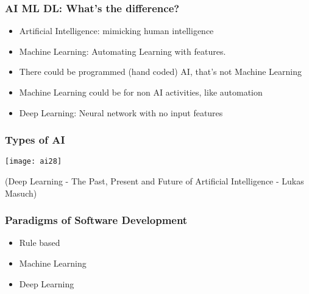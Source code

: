 \begin{frame}[fragile] \frametitle{AI ML DL: What's the difference?}

\begin{itemize}
\item Artificial Intelligence: mimicking human intelligence
\item Machine Learning: Automating Learning with features. 
\item There could be programmed (hand coded) AI, that's not Machine Learning
\item Machine Learning could be for non AI activities, like automation
\item Deep Learning: Neural network with no input features
\end{itemize}
\end{frame}


\begin{frame}[fragile] \frametitle{Types of AI}
\begin{center}
\texttt{[image: ai28]}
\end{center}
{\tiny (Deep Learning - The Past, Present and Future of Artificial Intelligence - Lukas Masuch)}
\end{frame}



\begin{frame}[fragile] \frametitle{Paradigms of Software Development}

\begin{itemize}
\item Rule based
\item Machine Learning
\item Deep Learning

\end{itemize}

\end{frame}


